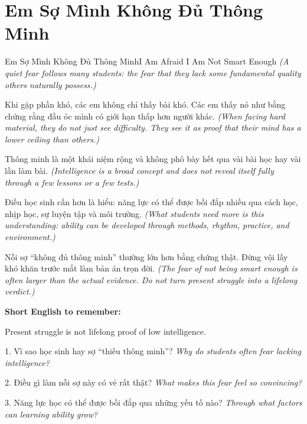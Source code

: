 \section{Em Sợ Mình Không Đủ Thông Minh}
\begin{truyen}{Em Sợ Mình Không Đủ Thông Minh}{I Am Afraid I Am Not Smart Enough}
\textit{(A quiet fear follows many students: the fear that they lack some fundamental quality others naturally possess.)}

Khi gặp phần khó, các em không chỉ thấy bài khó. Các em thấy nó như bằng chứng rằng đầu óc mình có giới hạn thấp hơn người khác.
\textit{(When facing hard material, they do not just see difficulty. They see it as proof that their mind has a lower ceiling than others.)}

Thông minh là một khái niệm rộng và không phô bày hết qua vài bài học hay vài lần làm bài.
\textit{(Intelligence is a broad concept and does not reveal itself fully through a few lessons or a few tests.)}

Điều học sinh cần hơn là hiểu: năng lực có thể được bồi đắp nhiều qua cách học, nhịp học, sự luyện tập và môi trường.
\textit{(What students need more is this understanding: ability can be developed through methods, rhythm, practice, and environment.)}
\end{truyen}

\begin{baihoc}
Nỗi sợ “không đủ thông minh” thường lớn hơn bằng chứng thật. Đừng vội lấy khó khăn trước mắt làm bản án trọn đời.
\textit{(The fear of not being smart enough is often larger than the actual evidence. Do not turn present struggle into a lifelong verdict.)}
\end{baihoc}

\begin{ghinhoanh}
\textbf{Short English to remember:}

Present struggle is not lifelong proof of low intelligence.

\end{ghinhoanh}

\begin{tuhocnhanh}
1. Vì sao học sinh hay sợ “thiếu thông minh”? \textit{Why do students often fear lacking intelligence?}

2. Điều gì làm nỗi sợ này có vẻ rất thật? \textit{What makes this fear feel so convincing?}

3. Năng lực học có thể được bồi đắp qua những yếu tố nào? \textit{Through what factors can learning ability grow?}
\end{tuhocnhanh}
\ngancach

